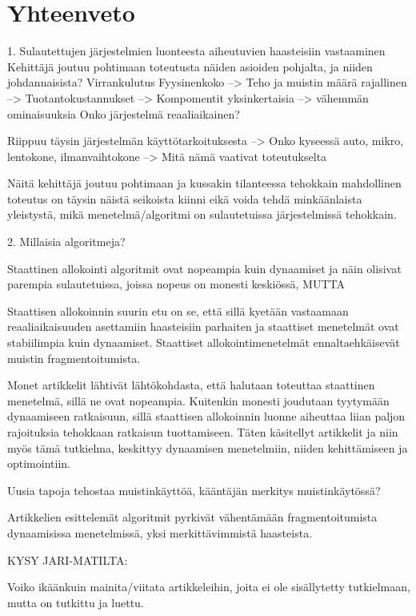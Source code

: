 \chapter{Yhteenveto} \label{Yhteenveto}


1. Sulautettujen järjestelmien luonteesta aiheutuvien haasteisiin vastaaminen
    Kehittäjä joutuu pohtimaan toteutusta näiden asioiden pohjalta, ja niiden johdannaisista?
        Virrankulutus
        Fyysinenkoko --> Teho ja muistin määrä rajallinen
                    --> 
        Tuotantokustannukset --> Kompomentit yksinkertaisia --> vähemmän ominaisuuksia
    Onko järjestelmä reaaliaikainen?

    Riippuu täysin järjestelmän käyttötarkoituksesta --> Onko kyseessä auto, mikro, lentokone, ilmanvaihtokone --> Mitä nämä vaativat toteutukselta

    Näitä kehittäjä joutuu pohtimaan ja kussakin tilanteessa tehokkain mahdollinen toteutus on täysin näistä seikoista kiinni eikä voida tehdä minkäänlaista yleistystä, mikä menetelmä/algoritmi on sulautetuissa järjestelmissä tehokkain.


2. Millaisia algoritmeja?

    Staattinen allokointi algoritmit ovat nopeampia kuin dynaamiset ja näin olisivat parempia sulautetuissa, joissa nopeus on monesti keskiössä, MUTTA

    Staattisen allokoinnin suurin etu on se, että sillä kyetään vastaamaan reaaliaikaisuuden asettamiin haasteisiin parhaiten ja staattiset menetelmät ovat stabiilimpia kuin dynaamiset. Staattiset allokointimenetelmät ennaltaehkäisevät muistin fragmentoitumista.\cite{daroemmfera@2006}

    Monet artikkelit lähtivät lähtökohdasta, että halutaan toteuttaa staattinen menetelmä, sillä ne ovat nopeampia. Kuitenkin monesti joudutaan tyytymään dynaamiseen ratkaisuun, sillä staattisen allokoinnin luonne aiheuttaa liian paljon rajoituksia tehokkaan ratkaisun tuottamiseen. Täten käsitellyt artikkelit ja niin myös tämä tutkielma, keskittyy dynaamisen menetelmiin, niiden kehittämiseen ja optimointiin.

    Uusia tapoja tehostaa muistinkäyttöä, kääntäjän merkitys muistinkäytössä?

    Artikkelien esittelemät algoritmit pyrkivät vähentämään fragmentoitumista dynaamisissa menetelmissä, yksi merkittävimmistä haasteista.


KYSY JARI-MATILTA:

    Voiko ikäänkuin mainita/viitata artikkeleihin, joita ei ole sisällytetty tutkielmaan, mutta on tutkittu ja luettu.


    